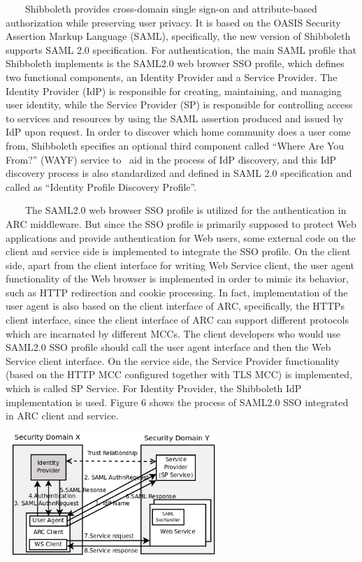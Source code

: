 \documentclass{article}
\newcounter{Figure}
\begin{document}
{\upshape\color{black}
\ \ \ \ Shibboleth provides cross-domain single sign-on and
attribute-based authorization while preserving user privacy. It is
based on the OASIS Security Assertion Markup Language (SAML),
specifically, the new version of Shibboleth supports SAML 2.0
specification. For authentication, the main SAML profile that
Shibboleth implements is the SAML2.0 web browser SSO profile, which
defines two functional components, an Identity Provider and a Service
Provider. The Identity Provider (IdP) is responsible for creating,
maintaining, and managing user identity, while the Service Provider
(SP) is responsible for controlling access to services and resources by
using the SAML assertion produced and issued by IdP upon request. In
order to discover which home community does a user come from,
Shibboleth specifies an optional third component called
{\textquotedblleft}Where Are You From?{\textquotedblright} (WAYF)
service to \ aid in the process of IdP discovery, and this IdP
discovery process is also standardized and defined in SAML 2.0
specification and called as {\textquotedblleft}Identity Profile
Discovery Profile{\textquotedblright}.}

{\upshape\color{black}
\ \ \ \ The SAML2.0 web browser SSO profile is utilized for the
authentication in ARC middleware. But since the SSO profile is
primarily supposed to protect Web applications and provide
authentication for Web users, some external code on the client and
service side is implemented to integrate the SSO profile. On the client
side, apart from the client interface for writing Web Service client,
the user agent functionality of the Web browser is implemented in order
to mimic its behavior, such as HTTP redirection and cookie processing.
In fact, implementation of the user agent is also based on the client
interface of ARC, specifically, the HTTPs client interface, since the
client interface of ARC can support different protocols which are
incarnated by different MCCs. The client developers who would use
SAML2.0 SSO profile should call the user agent interface and then the
Web Service client interface. On the service side, the Service Provider
functionality (based on the HTTP MCC configured together with TLS MCC)
is implemented, which is called SP Service. For Identity Provider, the
Shibboleth IdP implementation is used. Figure 6 shows the process of
SAML2.0 SSO integrated in ARC client and service.}



\begin{center}
\includegraphics[width=3.2256in,height=1.8472in]{SecurityFrameworkofARC1-img7.png}
\end{center}
\end{document}
